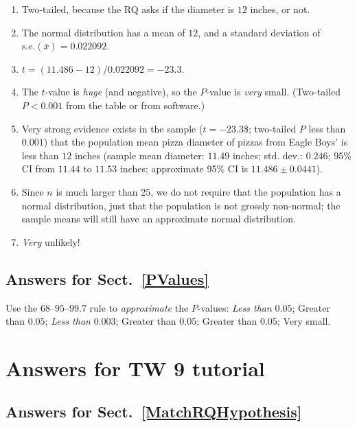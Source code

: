 \documentclass[
  11pt,
  a4paper,
  krantz2]{krantz}
\begin{document}
\begin{footnotesize}
\begin{enumerate}
  \(H_0\): The mean diameter is \(12\) inches; or \(\mu = 12\).\\
  \(H_1\): The mean diameter is not \(12\) inches; or \(\mu \ne 12\)
\item
  Two-tailed, because the RQ asks if the diameter is \(12\) inches, or not.
\item
  The normal distribution has a mean of \(12\), and a standard deviation of \(\text{s.e.}(\bar{x}) = 0.022092\).
\item
  \(t = (11.486-12)/0.022092 = -23.3\).
\item
  The \(t\)-value is \emph{huge} (and negative), so the \(P\)-value is \emph{very} small.
  (Two-tailed \(P<0.001\) from the table or from software.)
\item
  Very strong evidence exists in the sample (\(t = -23.3\)\$; two-tailed \(P\) less than \(0.001\)) that the population mean pizza diameter of pizzas from Eagle Boys' is less than \(12\) inches (sample mean diameter: \(11.49\) inches; std. dev.: \(0.246\);
  \(95\)\% CI from \(11.44\) to \(11.53\) inches; approximate 95\% CI is \(11.486\pm 0.0441\)).
\item
  Since \(n\) is much larger than \(25\), we do not require that the population has a normal distribution, just that the population is not grossly non-normal; the sample means will still have an approximate normal distribution.
\item
  \emph{Very} unlikely!
\end{enumerate}

\subsection*{Answers for Sect.~\ref{PValues}}\label{answers-for-sect.-refpvalues}

Use the \(68\)--\(95\)--\(99.7\) rule to \emph{approximate} the \(P\)-values:
\emph{Less than} \(0.05\); Greater than \(0.05\);
\emph{Less than} \(0.003\);
Greater than \(0.05\);
Greater than \(0.05\);
Very small.

\section{Answers for TW 9 tutorial}\label{Lecture9Answers}

\subsection*{Answers for Sect.~\ref{MatchRQHypothesis}}\label{answers-for-sect.-refmatchrqhypothesis}


\end{footnotesize}
\end{document}
